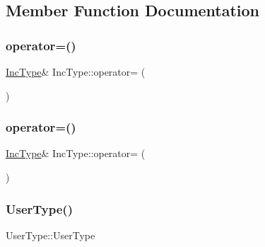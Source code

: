 \subsection{Member Function Documentation}
\mbox{\label{class_inc_type_ac076f3da73c92b406e8c25a07b19b704}} 
\subsubsection{\texorpdfstring{operator=()}{operator=()}\hspace{0.1cm}{\footnotesize\ttfamily [1/2]}}
{\footnotesize\ttfamily \mbox{\hyperlink{class_inc_type}{Inc\+Type}}\& Inc\+Type\+::operator= (\begin{DoxyParamCaption}\item[{const \mbox{\hyperlink{class_inc_type}{Inc\+Type}} \&}]{ }\end{DoxyParamCaption})\hspace{0.3cm}{\ttfamily [delete]}}

\mbox{\label{class_inc_type_a565fdcfcc4d3314d59987dd6249c5ef3}} 
\subsubsection{\texorpdfstring{operator=()}{operator=()}\hspace{0.1cm}{\footnotesize\ttfamily [2/2]}}
{\footnotesize\ttfamily \mbox{\hyperlink{class_inc_type}{Inc\+Type}}\& Inc\+Type\+::operator= (\begin{DoxyParamCaption}\item[{\mbox{\hyperlink{class_inc_type}{Inc\+Type}} \&\&}]{ }\end{DoxyParamCaption})\hspace{0.3cm}{\ttfamily [delete]}}

\mbox{\label{class_inc_type_a07d95c5b9030ed58983e95b53d3cfbc1}} 
\subsubsection{\texorpdfstring{UserType()}{UserType()}\hspace{0.1cm}{\footnotesize\ttfamily [1/2]}}
{\footnotesize\ttfamily User\+Type\+::\+User\+Type\hspace{0.3cm}{\ttfamily [default]}}

